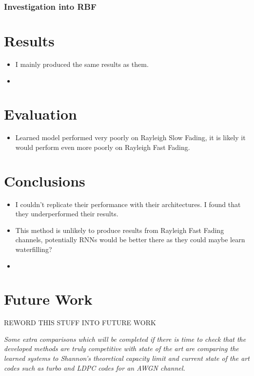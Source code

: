 \documentclass[12pt,onecolumn,letterpaper]{article}
\begin{document}
\subsubsection{Investigation into RBF}



\FloatBarrier
\section{Results}

\begin{itemize}
   \item I mainly produced the same results as them.
   \item 
\end{itemize}


\FloatBarrier
\section{Evaluation}

\begin{itemize}
   \item Learned model performed very poorly on Rayleigh Slow Fading, it is likely it would perform even more poorly on Rayleigh Fast Fading.
\end{itemize}

\FloatBarrier
\section{Conclusions}

\begin{itemize}
   \item I couldn't replicate their performance with their architectures. I found that they underperformed their results.
   \item This method is unlikely to produce results from Rayleigh Fast Fading channels, potentially RNNs would be better there as they could maybe learn waterfilling?
   \item 
\end{itemize}


\FloatBarrier
\section{Future Work}

REWORD THIS STUFF INTO FUTURE WORK

\textit{
Some extra comparisons which will be completed if there is time to check that the developed methods are truly competitive with state of the art are comparing the learned systems to Shannon's theoretical capacity limit and current state of the art codes such as turbo and LDPC codes for an AWGN channel.
}
\end{document}
